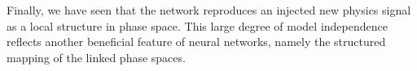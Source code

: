 Finally, we have seen that the network reproduces an injected new
physics signal as a local structure in phase space. This large degree
of model independence reflects another beneficial feature of neural
networks, namely the structured mapping of the linked phase spaces.



%
